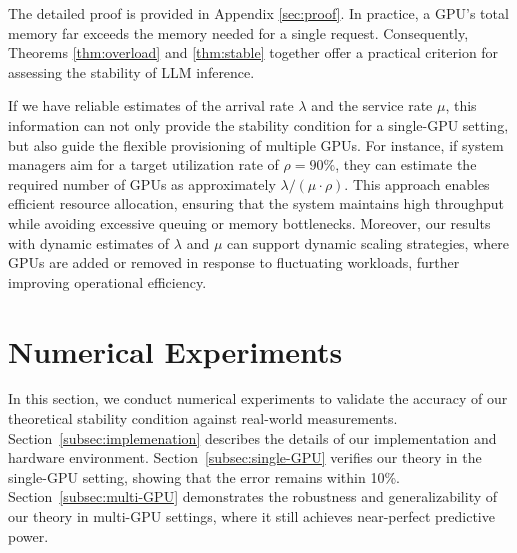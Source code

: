 \documentclass{article}
\theoremstyle{plain}
\theoremstyle{definition}
\theoremstyle{remark}
\begin{document}

The detailed proof is provided in Appendix \ref{sec:proof}. In practice, a GPU’s total memory far exceeds the memory needed for a single request. Consequently, Theorems \ref{thm:overload} and \ref{thm:stable} together offer a practical criterion for assessing the stability of LLM inference.

If we have reliable estimates of the arrival rate $\lambda$ and the service rate $\mu$, this information can not only provide the stability condition for a single-GPU setting, but also guide the flexible provisioning of multiple GPUs. For instance, if system managers aim for a target utilization rate of $\rho = 90\%$, they can estimate the required number of GPUs as approximately $\lambda  / (\mu \cdot \rho)$. This approach enables efficient resource allocation, ensuring that the system maintains high throughput while avoiding excessive queuing or memory bottlenecks. Moreover, our results with dynamic estimates of $\lambda$ and $\mu$ can support dynamic scaling strategies, where GPUs are added or removed in response to fluctuating workloads, further improving operational efficiency.




\section{Numerical Experiments} \label{sec:num}

In this section, we conduct numerical experiments to validate the accuracy of our theoretical stability condition against real-world measurements. Section~\ref{subsec:implemenation} describes the details of our implementation and hardware environment. Section~\ref{subsec:single-GPU} verifies our theory in the single-GPU setting, showing that the error remains within 10\%. Section~\ref{subsec:multi-GPU} demonstrates the robustness and generalizability of our theory in multi-GPU settings, where it still achieves near-perfect predictive power.
\end{document}
